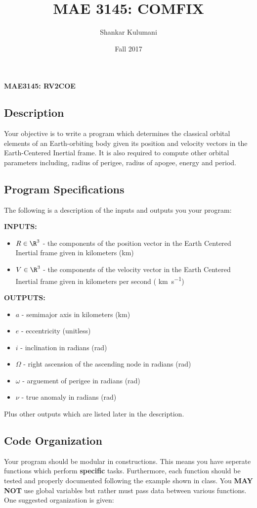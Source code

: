 \documentclass[11pt, reqno]{article}    %
\title{MAE 3145: COMFIX}
\author{Shankar Kulumani}
\date{Fall 2017}                          %
\begin{document}
\begin{center}
{\Large \textbf{MAE3145: RV2COE}}
\end{center}
\subsection*{Description}

Your objective is to write a program which determines the classical orbital elements of an Earth-orbiting body given its position and velocity vectors in the Earth-Centered Inertial frame.
It is also required to compute other orbital parameters including, radius of perigee, radius of apogee, energy and period.

\subsection*{Program Specifications}
The following is a description of the inputs and outputs you your program:

\noindent \textbf{INPUTS:}
\begin{itemize}
    \item \( R \in \R^{3} \) - the components of the position vector in the Earth Centered Inertial frame given in kilometers (\si{\kilo\meter})
    \item \( V \in \R^{3} \) - the components of the velocity vector in the Earth Centered Inertial frame given in kilometers per second ( \si{\kilo\meter\per\second})
\end{itemize}

\noindent \textbf{OUTPUTS:}
\begin{itemize}
    \item \( a \)  - semimajor axis in kilometers (\si{\kilo\meter})
    \item \( e \) - eccentricity (unitless)
    \item \( i \) - inclination in radians (\si{\radian})
    \item \( \Omega \) - right ascension of the ascending node in radians (\si{\radian})
    \item \( \omega \) - arguement of perigee in radians (\si{\radian})
    \item \( \nu \) - true anomaly in radians (\si{\radian})
\end{itemize}
Plus other outputs which are listed later in the description.

\subsection*{Code Organization} 
Your program should be modular in constructions. 
This means you have seperate functions which perform \textbf{specific} tasks.
Furthermore, each function should be tested and properly documented following the example shown in class.
You \textbf{MAY NOT}  use global variables but rather must pass data between various functions.
One suggested organization is given:
\end{document}
